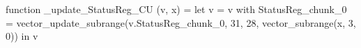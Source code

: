 function _update_StatusReg_CU (v, x) = let v = { v with StatusReg_chunk_0 = vector_update_subrange(v.StatusReg_chunk_0, 31, 28, vector_subrange(x, 3, 0)) } in v
